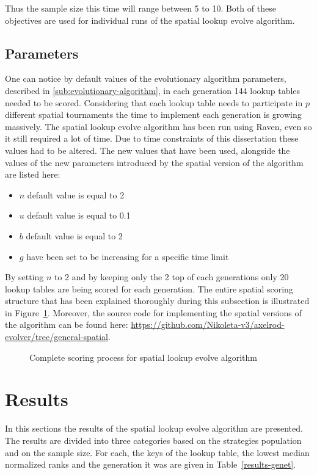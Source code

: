 Thus the sample size this time will range between 5 to 10. Both of these
objectives are used for individual runs of the spatial lookup evolve algorithm.

\subsection{Parameters}

One can notice by default values of the evolutionary algorithm parameters,
described in \autoref{sub:evolutionary-algorithm}, in each generation
144 lookup tables needed to be scored. Considering that each lookup table needs
to participate in \(p\) different spatial tournaments the time to implement
each generation is growing massively. The spatial lookup evolve algorithm
has been run using Raven, even so it still required a lot of time. Due to time
constraints of this dissertation these values had to be altered. The new values
that have been used, alongside the values of the new parameters introduced
by the spatial version of the algorithm are listed here:
\begin{itemize}
    \item \(n\) default value is equal to 2
    \item \(u\) default value is equal to 0.1
    \item \(b\) default value is equal to 2
    \item \(g\) have been set to be increasing for a specific time limit
\end{itemize}

By setting \(n\) to 2 and by keeping only the 2 top of each generations only
20 lookup tables are being scored for each generation. The entire spatial scoring structure that
has been explained thoroughly during this subsection is illustrated in Figure~\ref{fig:spatial-evolve}.
Moreover, the source code for implementing the spatial versions of the algorithm
can be found here: \url{https://github.com/Nikoleta-v3/axelrod-evolver/tree/general-spatial}.

\begin{figure}[H]
		
		\caption{Complete scoring process for spatial lookup evolve algorithm}
  \label{fig:spatial-evolve}
\end{figure}

\section{Results}
\label{sub:results}
In this sections the results of the spatial lookup evolve algorithm are
presented. The results are divided into three categories based on the strategies
population and on the sample size. For each, the keys of the lookup table,
the lowest median normalized ranks and the generation it was are given
in Table~\ref{results-genet}.


